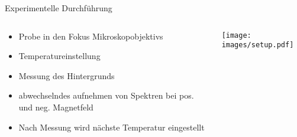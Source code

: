 \begin{frame}{Experimentelle Durchführung}
    \pause
    \begin{columns}
        \begin{column}{0.5\textwidth}
            \begin{itemize}
                \item <1-> Probe in den Fokus Mikroskopobjektivs 
                \bigskip
                \item <3-> Temperatureinstellung 
                \bigskip
                \item <4-> Messung des Hintergrunds
                \bigskip
                \item <5-> abwechselndes aufnehmen von Spektren bei pos. und neg. Magnetfeld
                \bigskip
                \item <6-> Nach Messung wird nächste Temperatur eingestellt
            \end{itemize}                
        \end{column}
        \begin{column}{0.5\textwidth}
            \centering
            \texttt{[image: images/setup.pdf]}\\[-0.5\baselineskip]
        \end{column}
    \end{columns}
\end{frame}